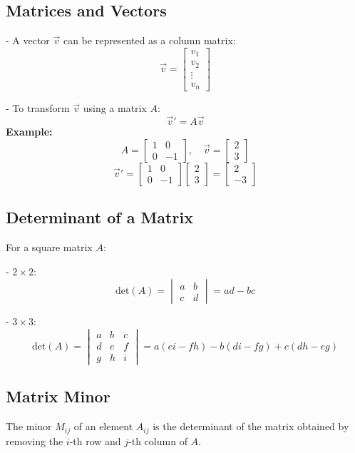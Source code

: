 \documentclass{article}
\begin{document}
\begin{multicols}{2}
\subsection*{Matrices and Vectors}
- A vector \( \vec{v} \) can be represented as a column matrix:
\[
\vec{v} = \begin{bmatrix} v_1 \\ v_2 \\ \vdots \\ v_n \end{bmatrix}
\]

- To transform \( \vec{v} \) using a matrix \( A \):
\[
\vec{v}' = A \vec{v}
\]
\textbf{Example:}
\[
A = \begin{bmatrix} 1 & 0 \\ 0 & -1 \end{bmatrix}, \quad \vec{v} = \begin{bmatrix} 2 \\ 3 \end{bmatrix}
\]
\[
\vec{v}' = \begin{bmatrix} 1 & 0 \\ 0 & -1 \end{bmatrix} \begin{bmatrix} 2 \\ 3 \end{bmatrix} = \begin{bmatrix} 2 \\ -3 \end{bmatrix}
\]

\subsection*{Determinant of a Matrix}
For a square matrix \( A \):

- \( 2 \times 2 \):
\[
\text{det}(A) = \begin{vmatrix} a & b \\ c & d \end{vmatrix} = ad - bc
\]

- \( 3 \times 3 \):
\[
\text{det}(A) = \begin{vmatrix} a & b & c \\ d & e & f \\ g & h & i \end{vmatrix} = a(ei - fh) - b(di - fg) + c(dh - eg)
\]

\subsection*{Matrix Minor}
The minor \( M_{ij} \) of an element \( A_{ij} \) is the determinant of the matrix obtained by removing the \( i \)-th row and \( j \)-th column of \( A \).


\end{multicols}
\end{document}
